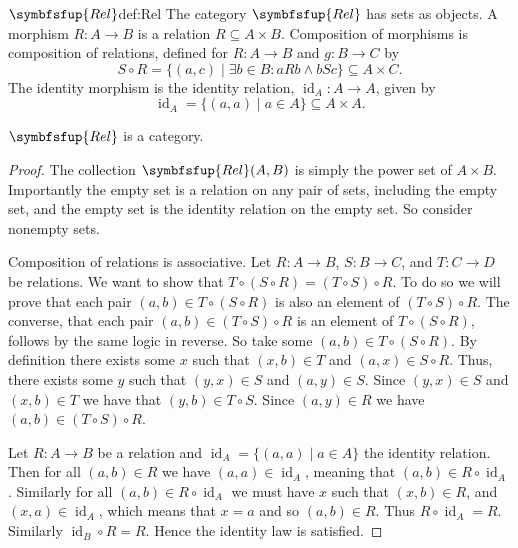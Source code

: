 \documentclass[fleqn]{NotesClass}
\makeatletter
\newcommand{\c@egory}[1]{\symbfsfup{#1}}
\newcommand{\Rel}{\c@egory{Rel}}
\DeclareMathOperator{\id}{id}
\makeatother
\begin{document}
    \begin{dfn}{\normalsize\(\Rel\)}{def:Rel}
        The category \(\Rel\)\index{Rel@\(\Rel\)} has sets as objects.
        A morphism \(R \colon A \to B\) is a relation \(R \subseteq A \times B\).
        Composition of morphisms is composition of relations, defined for \(R \colon A \to B\) and \(g \colon B \to C\) by
        \begin{equation}
            S \circ R = \{(a, c) \mid \exists b \in B : aRb \land bSc\} \subseteq A \times C.
        \end{equation}
        The identity morphism is the identity relation, \(\id_A \colon A \to A\), given by
        \begin{equation}
            \id_A = \{(a, a) \mid a \in A\} \subseteq A \times A.
        \end{equation}
    \end{dfn}
    
    \begin{lma}{}{}
        \(\Rel\) is a category.
        \begin{proof}
            The collection \(\Rel(A, B)\) is simply the power set of \(A \times B\).
            Importantly the empty set is a relation on any pair of sets, including the empty set, and the empty set is the identity relation on the empty set.
            So consider nonempty sets.
            
            Composition of relations is associative.
            Let \(R \colon A \to B\), \(S \colon B \to C\), and \(T \colon C \to D\) be relations.
            We want to show that \(T \circ (S \circ R) = (T \circ S) \circ R\).
            To do so we will prove that each pair \((a, b) \in T \circ (S \circ R)\) is also an element of \((T \circ S) \circ R\).
            The converse, that each pair \((a, b) \in (T \circ S) \circ R\) is an element of \(T \circ (S \circ R)\), follows by the same logic in reverse.
            So take some \((a, b) \in T \circ (S \circ R)\).
            By definition there exists some \(x\) such that \((x, b) \in T\) and \((a, x) \in S \circ R\).
            Thus, there exists some \(y\) such that \((y, x) \in S\) and \((a, y) \in S\).
            Since \((y, x) \in S\) and \((x, b) \in T\) we have that \((y, b) \in T \circ S\).
            Since \((a, y) \in R\) we have \((a, b) \in (T \circ S) \circ R\).
            
            Let \(R \colon A \to B\) be a relation and \(\id_A = \{(a, a) \mid a \in A\}\) the identity relation.
            Then for all \((a, b) \in R\) we have \((a, a) \in \id_A\), meaning that \((a, b) \in R \circ \id_A\).
            Similarly for all \((a, b) \in R \circ \id_A\) we must have \(x\) such that \((x, b) \in R\), and \((x, a) \in \id_A\), which means that \(x = a\) and so \((a, b) \in R\).
            Thus \(R \circ \id_A = R\).
            Similarly \(\id_B \circ R = R\).
            Hence the identity law is satisfied.
        \end{proof}
    \end{lma}
    
\end{document}
